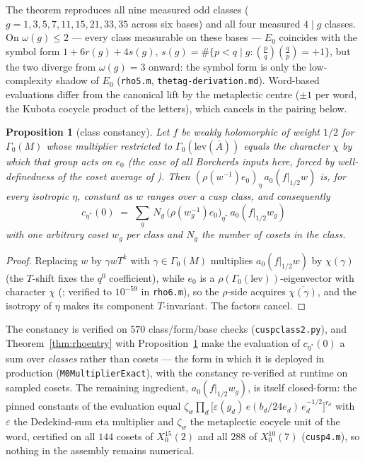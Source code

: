 \documentclass[11pt,reqno]{amsart}
\theoremstyle{plain}
\newtheorem{proposition}[theorem]{Proposition}
\theoremstyle{definition}
\begin{document}
The theorem reproduces all nine measured odd classes ($g=1,3,5,7,11,15,21,33,35$ across
six bases) and all four measured $4\mid g$ classes. On $\omega(g)\le2$ --- every class
measurable on these bases --- $E_0$ coincides with the symbol form $1+6r(g)+4s(g)$,
$s(g)=\#\{p<q\mid g:(\tfrac pq)(\tfrac qp)=+1\}$, but the two diverge from $\omega(g)=3$
onward: the symbol form is only the low-complexity shadow of $E_0$
(\texttt{rho5.m}, \texttt{thetag-derivation.md}). Word-based evaluations differ from the
canonical lift by the metaplectic centre ($\pm1$ per word, the Kubota cocycle product of
the letters), which cancels in the pairing below.

\begin{proposition}[class constancy]\label{prop:constancy}
Let $f$ be weakly holomorphic of weight $1/2$ for $\Gamma_0(M)$ whose multiplier
restricted to $\Gamma_0(\mathrm{lev}(\bar A))$ equals the character $\chi$ by which that
group acts on $e_0$ (the case of all Borcherds inputs here, forced by well-definedness of
the coset average of \cite[Lem.~24]{GY}). Then
$(\rho(w^{-1})e_0)_{\eta}\,a_0(f\vert_{1/2}w)$ is, for every isotropic $\eta$, constant
as $w$ ranges over a cusp class, and consequently
\[
  c_{\eta^*}(0)\;=\;\sum_{g}\,N_g\,
  \bigl(\rho(w_g^{-1})e_0\bigr)_{\eta^*}\,a_0(f\vert_{1/2}w_g)
\]
with one arbitrary coset $w_g$ per class and $N_g$ the number of cosets in the class.
\end{proposition}

\begin{proof}
Replacing $w$ by $\gamma wT^k$ with $\gamma\in\Gamma_0(M)$ multiplies
$a_0(f\vert_{1/2}w)$ by $\chi(\gamma)$ (the $T$-shift fixes the $q^0$ coefficient), while
$e_0$ is a $\rho(\Gamma_0(\mathrm{lev}))$-eigenvector with character $\chi$
(\cite[Lem.~5.5, 5.6]{Stromberg2013}; verified to $10^{-59}$ in \texttt{rho6.m}), so the
$\rho$-side acquires $\overline{\chi(\gamma)}$, and the isotropy of $\eta$ makes its
component $T$-invariant. The factors cancel.
\end{proof}

The constancy is verified on $570$ class/form/base checks
(\texttt{cuspclass2.py}), and Theorem~\ref{thm:rhoentry} with
Proposition~\ref{prop:constancy} make the evaluation of $c_{\eta^*}(0)$ a sum over
\emph{classes} rather than cosets --- the form in which it is deployed in production
(\texttt{M0MultiplierExact}), with the constancy re-verified at runtime on sampled
cosets. The remaining ingredient, $a_0(f\vert_{1/2}w_g)$, is itself closed-form: the
pinned constants of the evaluation equal $\zeta_w\prod_d\bigl[\varepsilon(g_d)\,
e(b_d/24e_d)\,e_d^{-1/2}\bigr]^{r_d}$ with $\varepsilon$ the Dedekind-sum eta multiplier
and $\zeta_w$ the metaplectic cocycle unit of the word, certified on all $144$ cosets of
$X_0^{15}(2)$ and all $288$ of $X_0^{10}(7)$ (\texttt{cusp4.m}), so nothing in the
assembly remains numerical.
\end{document}
